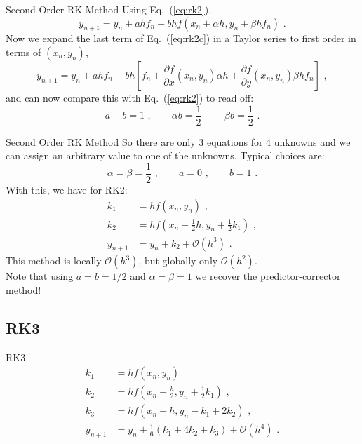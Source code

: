 \documentclass[11pt]{beamer}
\begin{document}
\begin{frame}[fragile]{Second Order RK Method}
Using Eq.~(\ref{eq:rk2}),
\begin{equation}
y_{n+1} = y_n + a h f_n + b h f(x_n + \alpha h, y_n + \beta h f_n)\,\,.
\label{eq:rk2c}
\end{equation}
Now we expand the last term of Eq.~(\ref{eq:rk2c}) in a Taylor
series to first order in terms of $(x_n,y_n)$,
\begin{equation}
y_{n+1} = y_n + a h f_n + bh\left[ f_n + \frac{\partial f}{\partial x}(x_n,y_n) \alpha h + 
\frac{\partial f}{\partial y}(x_n,y_n) \beta h f_n \right]\,\,,
\end{equation}
and can now compare this with Eq.~(\ref{eq:rk2}) to read off:
\begin{equation}
a+b = 1\,\,,\hspace{2em} \alpha b = \frac{1}{2}\,\,\hspace{2em} \beta b = \frac{1}{2}\,\,.
\end{equation}
\end{frame}

\begin{frame}[fragile]{Second Order RK Method}
So there are only 3 equations for 4 unknowns and we can assign an arbitrary
value to one of the unknowns. Typical choices are:
\begin{equation}
\alpha = \beta = \frac{1}{2}\,\,,\hspace{2em} a=0\,\,, \hspace{2em} b = 1\,\,.
\end{equation}
With this, we have for RK2:
\begin{align}
k_1 & = h f(x_n,y_n)\,\,,\\
k_2 & = h f(x_n + \frac{1}{2}h, y_n + \frac{1}{2}k_1)\,\,,\\
y_{n+1} & = y_n + k_2 + \mathcal{O}(h^3)\,\,.
\end{align}
This method is locally $\mathcal{O}(h^3)$, but globally
only $\mathcal{O}(h^2)$. \\
\tiny 
Note that using 
$a=b=1/2$ and $\alpha=\beta=1$ we recover the predictor-corrector method!
\end{frame}



\subsection{RK3}
\begin{frame}[fragile]{RK3}
\begin{align}
k_1 &=h f(x_n,y_n)\,\,\nonumber\\
k_2 &= h f(x_n + \frac{h}{2},y_n + \frac{1}{2} k_1)\,\,,\nonumber\\
k_3 &= h f(x_n + h, y_n - k_1 + 2 k_2)\,\,,\nonumber\\
y_{n+1} &= y_n + \frac{1}{6}(k_1 + 4 k_2 + k_3) + \mathcal{O}(h^4)\,\,.
\end{align}
\end{frame}
\end{document}
